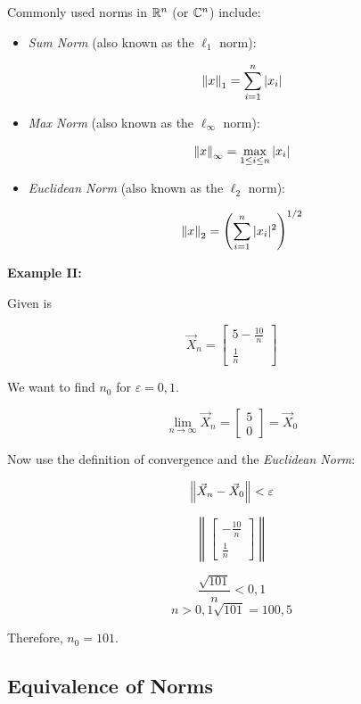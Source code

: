 Commonly used norms in \( \mathbb{R}^n \) (or \( \mathbb{C}^n \)) include:

\begin{itemize}
    
    \item \emph{Sum Norm} (also known as the \( \ell_1 \) norm): 
    
    \[
        \left\| x \right\|_1 = \sum_{i=1}^n |x_i|
    \]
    
    \item \emph{Max Norm} (also known as the \( \ell_\infty \) norm): 
    
    \[
        \left\| x \right\|_\infty = \max_{1 \leq i \leq n} |x_i|
    \]
    
    \item \emph{Euclidean Norm} (also known as the \( \ell_2 \) norm): 
    
    \[
        \left\| x \right\|_2 = \left( \sum_{i=1}^n |x_i|^2 \right)^{1/2}
    \]

\end{itemize}

\textbf{Example II:}

Given is

\[
    \vec{X}_n = 
    \begin{bmatrix}
    5 - \frac{10}{n}\\
    \frac{1}{n}   
    \end{bmatrix}
\]

We want to find \(n_0\) for \(\varepsilon = 0,1\).

\[
    \lim_{n \to \infty} \vec{X}_n = 
    \begin{bmatrix}
    5 \\
    0
    \end{bmatrix}
    = \vec{X}_0
\]

Now use the definition of convergence and the \emph{Euclidean Norm}:

\[
    \left\| \vec{X}_n - \vec{X}_0 \right\| < \varepsilon
\]

\[
    \left\| 
    \begin{bmatrix}
        -\frac{10}{n}\\
        \frac{1}{n}
    \end{bmatrix}
    \right\|
\]

\[
    \frac{\sqrt{101}}{n} < 0,1
\]
\[
    n > 0,1 \sqrt{101} = 100,5
\]

Therefore, \(n_0 = 101\).

\subsection{Equivalence of Norms}

